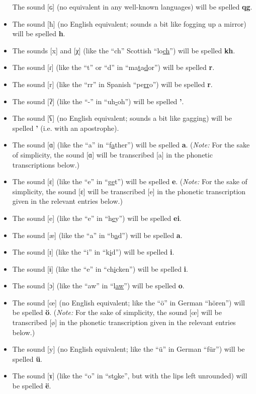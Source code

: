 \begin{itemize}
The sound [ɢ] (no equivalent in any well-known languages) will be spelled \textbf{qg}.
\item
The sound [ħ] (no English equivalent; sounds a bit like fogging up a mirror) will be spelled \textbf{h}.
\item
The sounds [x] and [χ] (like the ``ch'' Scottish ``lo\uline{ch}'') will be spelled \textbf{kh}.
\item
The sound [ɾ] (like the ``t'' or ``d'' in ``ma\uline{t}a\uline{d}or'') will be spelled \textbf{r}.
\item
The sound [r] (like the ``rr'' in Spanish ``pe\uline{rr}o'') will be spelled \textbf{r}.
\item
The sound [ʔ] (like the ``-'' in ``uh\uline{-}oh'') will be spelled \textbf{'}.
\item
The sound [ʕ] (no English equivalent; sounds a bit like gagging) will be spelled \textbf{'} (i.e. with an apostrophe).
\item
The sound [ɑ] (like the ``a'' in ``f\uline{a}ther'') will be spelled \textbf{a}.
(\emph{Note:} For the sake of simplicity, the sound [ɑ] will be transcribed [a] in the phonetic transcriptions below.)
\item
The sound [ɛ] (like the ``e'' in ``g\uline{e}t'') will be spelled \textbf{e}.
(\emph{Note:} For the sake of simplicity, the sound [ɛ] will be transcribed [e] in the phonetic transcription given in the relevant entries below.)
\item
The sound [e] (like the ``e'' in ``h\uline{e}y'') will be spelled \textbf{ei}.
\item
The sound [æ] (like the ``a'' in ``b\uline{a}d'') will be spelled \textbf{a}.
\item
The sound [ɪ] (like the ``i'' in ``k\uline{i}d'') will be spelled \textbf{i}.
\item
The sound [ɨ] (like the ``e'' in ``ch\uline{i}cken'') will be spelled \textbf{i}.
\item
The sound [ɔ] (like the ``aw'' in ``l\uline{aw}'') will be spelled \textbf{o}.
\item
The sound [œ] (no English equivalent; like the ``ö'' in German ``hören'') will be spelled \textbf{ö}.
(\emph{Note:} For the sake of simplicity, the sound [œ] will be transcribed [ø] in the phonetic transcription given in the relevant entries below.)
\item
The sound [y] (no English equivalent; like the ``ü'' in German ``für'') will be spelled \textbf{ü}.
\item
The sound [ɤ] (like the ``o'' in ``st\uline{o}ke'', but with the lips left unrounded) will be spelled \textbf{ë}.

\end{itemize}
